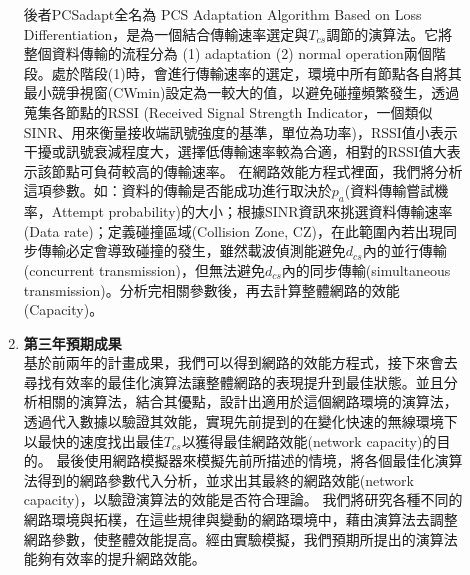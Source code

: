 \documentclass[12pt,a4paper]{article}
\begin{document}
\begin{description}
\begin{enumerate}
後者PCSadapt全名為
PCS Adaptation Algorithm Based on Loss Differentiation，是為一個結合傳輸速率選定與$T_{cs}$調節的演算法。它將整個資料傳輸的流程分為 (1) adaptation (2) normal operation兩個階段。處於階段(1)時，會進行傳輸速率的選定，環境中所有節點各自將其最小競爭視窗(CWmin)設定為一較大的值，以避免碰撞頻繁發生，透過蒐集各節點的RSSI (Received Signal Strength Indicator，一個類似SINR、用來衡量接收端訊號強度的基準，單位為功率)，RSSI值小表示干擾或訊號衰減程度大，選擇低傳輸速率較為合適，相對的RSSI值大表示該節點可負荷較高的傳輸速率。
在網路效能方程式裡面，我們將分析這項參數。如：資料的傳輸是否能成功進行取決於$p_a$(資料傳輸嘗試機率，Attempt probability)的大小；根據SINR資訊來挑選資料傳輸速率 (Data rate)；定義碰撞區域(Collision Zone, CZ)，在此範圍內若出現同步傳輸必定會導致碰撞的發生，雖然載波偵測能避免$d_{cs}$內的並行傳輸(concurrent transmission)，但無法避免$d_{cs}$內的同步傳輸(simultaneous transmission)。分析完相關參數後，再去計算整體網路的效能(Capacity)。\\

\item [\textbullet]	{\textbf{\Kai 第三年預期成果}}\\

基於前兩年的計畫成果，我們可以得到網路的效能方程式，接下來會去尋找有效率的最佳化演算法讓整體網路的表現提升到最佳狀態。並且分析相關的演算法，結合其優點，設計出適用於這個網路環境的演算法，透過代入數據以驗證其效能，實現先前提到的在變化快速的無線環境下以最快的速度找出最佳$T_{cs}$以獲得最佳網路效能(network capacity)的目的。
最後使用網路模擬器來模擬先前所描述的情境，將各個最佳化演算法得到的網路參數代入分析，並求出其最終的網路效能(network capacity)，以驗證演算法的效能是否符合理論。
我們將研究各種不同的網路環境與拓樸，在這些規律與變動的網路環境中，藉由演算法去調整網路參數，使整體效能提高。經由實驗模擬，我們預期所提出的演算法能夠有效率的提升網路效能。\\


\end{enumerate}
\end{description}
\end{document}
